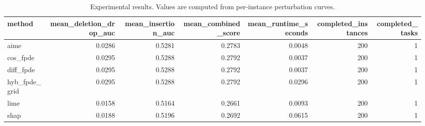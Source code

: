 \begin{table}[t]
\caption{Experimental results. Values are computed from per-instance perturbation curves.}
\label{tab:main_results_computed}
\centering
\begin{tabular}{lrrrrrr}
\toprule
method & mean\_deletion\_drop\_auc & mean\_insertion\_auc & mean\_combined\_score & mean\_runtime\_seconds & completed\_instances & completed\_tasks \\
\midrule
aime & 0.0286 & 0.5281 & 0.2783 & 0.0048 & 200 & 1 \\
cos\_fpde & 0.0295 & 0.5288 & 0.2792 & 0.0037 & 200 & 1 \\
diff\_fpde & 0.0295 & 0.5288 & 0.2792 & 0.0037 & 200 & 1 \\
hyb\_fpde\_grid & 0.0295 & 0.5288 & 0.2792 & 0.0296 & 200 & 1 \\
lime & 0.0158 & 0.5164 & 0.2661 & 0.0093 & 200 & 1 \\
shap & 0.0188 & 0.5196 & 0.2692 & 0.0615 & 200 & 1 \\
\bottomrule
\end{tabular}

\end{table}
